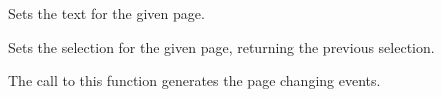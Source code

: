 \label{wxnotebooksetpagetext}


Sets the text for the given page.


\label{wxnotebooksetselection}


Sets the selection for the given page, returning the previous selection.

The call to this function generates the page changing events.




